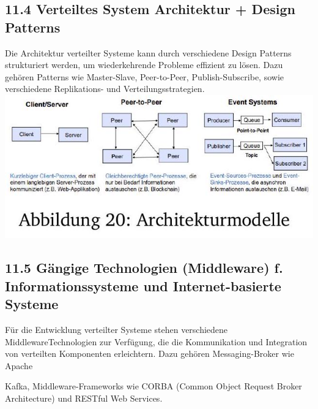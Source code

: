 \documentclass[10pt]{article}
\begin{document}
\subsection*{11.4 Verteiltes System Architektur + Design Patterns}
Die Architektur verteilter Systeme kann durch verschiedene Design Patterns strukturiert werden, um wiederkehrende Probleme effizient zu lösen. Dazu gehören Patterns wie Master-Slave, Peer-to-Peer, Publish-Subscribe, sowie verschiedene Replikations- und Verteilungsstrategien.\\
\includegraphics[max width=\textwidth, center]{2024_12_29_0d1d7b5551ea1b4b41bdg-18}

\subsection*{11.5 Gängige Technologien (Middleware) f. Informationssysteme und Internet-basierte Systeme}
Für die Entwicklung verteilter Systeme stehen verschiedene MiddlewareTechnologien zur Verfügung, die die Kommunikation und Integration von verteilten Komponenten erleichtern. Dazu gehören Messaging-Broker wie Apache

Kafka, Middleware-Frameworks wie CORBA (Common Object Request Broker Architecture) und RESTful Web Services.
\end{document}
